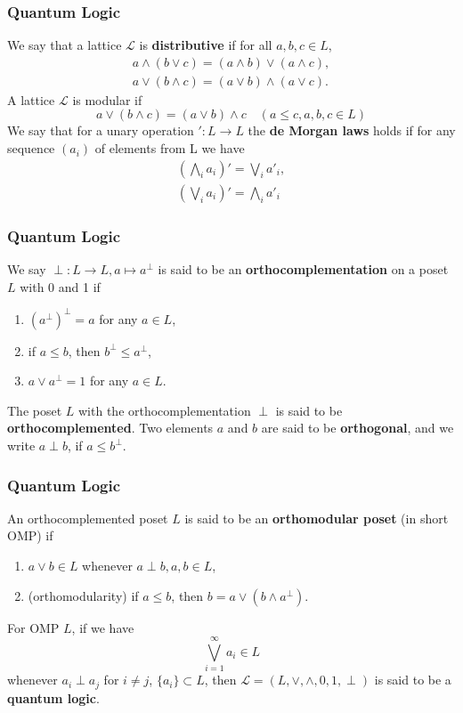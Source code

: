 \documentclass{beamer}
\begin{document}
\begin{frame}
    \frametitle{Quantum Logic}
We say that a lattice \(\mathcal{L}\) is \textbf{distributive} if for all \(a,b,c \in L\),
\begin{gather*}
    a\wedge(b\vee c) = (a\wedge b) \vee (a\wedge c),\\
    a \vee (b \wedge c) = (a \vee b) \wedge (a\vee c).
\end{gather*}
A lattice \(\mathcal{L}\) is modular if
\[a \vee ( b \wedge c) = (a\vee b)\wedge c \quad (a\le c, a,b,c \in L)\]
We say that for a unary operation \(': L\to L\) the \textbf{de Morgan laws} holds if for any sequence \((a_i)\) of elements from L we have
\begin{gather*}
    (\bigwedge_i a_i)' = \bigvee_i a'_i, \\
    (\bigvee_i a_i)' = \bigwedge_i a'_i
\end{gather*}

\end{frame}

\begin{frame}
    \frametitle{Quantum Logic}
We say \(\perp: L \to L, a \mapsto a^\perp \) is said to be an \textbf{orthocomplementation} on a poset \(L\) with 0 and 1 if
\begin{enumerate}
    \item \((a^\perp)^\perp = a\) for any \(a \in L\),\\
    \item if \(a \le b\), then \(b^\perp \le a^\perp \),
    \item \(a \vee a^\perp=1\) for any \(a\in L\).
\end{enumerate}
The poset \(L\) with the orthocomplementation \(\perp\) is said to be \textbf{orthocomplemented}. Two elements \(a\) and \(b\) are said to be \textbf{orthogonal}, and we write \(a\perp b\), if \(a\le b^\perp\).


\end{frame}

\begin{frame}
    \frametitle{Quantum Logic}
    An orthocomplemented poset \(L\) is said to be an \textbf{orthomodular poset} (in short OMP) if \pause
\begin{enumerate}
    \item \(a\vee b \in L\) whenever \(a\perp b,a,b \in L\),\pause
    \item (orthomodularity) if \(a\le b\), then \(b=a\vee(b\wedge a^\perp)\).\pause
\end{enumerate}
    For OMP \(L\), if we have
    \[\bigvee^{\infty}_{i=1} a_i \in L\]
    whenever \(a_i \perp a_j\) for \(i \neq j\), \(\{a_i\} \subset L\), then \(\mathcal{L}=(L,\vee,\wedge,0,1,\perp)\) is said to be a \textbf{quantum logic}.
\end{frame}
\end{document}
